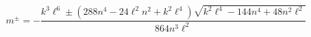 \begin{equation}
m^{\pm }=-\frac{k^{3}\ell ^{6}\pm (288n^{4}-24\ell ^{2}n^{2}+k^{2}\ell ^{4})%
\sqrt{k^{2}\ell ^{4}-144n^{4}+48n^{2}\ell ^{2}}}{864n^{3}\ell ^{2}}
\label{massesonn}
\end{equation}%
